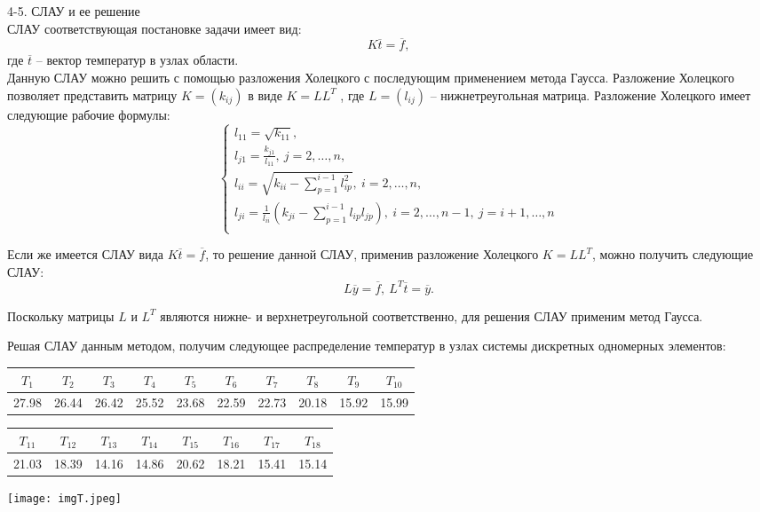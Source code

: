 \documentclass[a4paper, 12pt]{article}
\begin{document}
\newpage

4-5. СЛАУ и ее решение \\

СЛАУ соответствующая постановке задачи имеет вид:
\[K \overline t = \overline f,\]
где $\overline t$ – вектор температур в узлах области. \\

Данную СЛАУ можно решить с помощью разложения
Холецкого с последующим применением метода Гаусса. 
Разложение Холецкого позволяет представить матрицу $K = (k_{ij})$ в виде $K=LL^T$ , где $L = (l_{ij})$ – нижнетреугольная матрица. Разложение Холецкого имеет следующие рабочие формулы:
\[
\begin{cases}
l_{11} = \sqrt{k_{11}},\\
l_{j1} = \frac{k_{j1}}{l_{11}},\ j = 2, \dots, n,\\
l_{ii} = \sqrt{k_{ii} - \sum \limits_{p=1}^{i-1} l_{ip}^2}, \ i = 2, \dots, n,\\
l_{ji} = \frac{1}{l_{ii}} \left( k_{ji} - \sum \limits_{p=1}^{i-1} l_{ip} l_{jp} \right),\ i = 2, \dots, n-1,\ j = i+1, \dots, n\\
\end{cases}
\]

Если же имеется СЛАУ вида $K \overline t = \overline f$, то решение данной СЛАУ, применив разложение
Холецкого $K=LL^T$, можно получить следующие СЛАУ:
\[L \overline y = \overline f,\ L^T \overline t = \overline y.\]

Поскольку матрицы $L$ и $L^T$ являются нижне- и верхнетреугольной соответственно, для решения
СЛАУ применим метод Гаусса.

Решая СЛАУ данным методом, получим следующее распределение температур в узлах системы дискретных одномерных элементов:

\begin{table}[h]
    \centering
    \begin{tabular}{|c|c|c|c|c|c|c|c|c|c|}
        \toprule
        $T_1$&$T_2$&$T_3$&$T_4$&$T_5$&$T_6$&$T_7$&$T_8$&$T_9$&$T_{10}$\\ 
        \midrule
        27.98&26.44&26.42&25.52&23.68&22.59&22.73&20.18&15.92&15.99 \\ 
  \bottomrule
    \end{tabular}
\end{table}
\begin{table}[h]
    \centering
    \begin{tabular}{|c|c|c|c|c|c|c|c|}
        \toprule
        $T_{11}$&$T_{12}$&$T_{13}$&$T_{14}$&$T_{15}$&$T_{16}$&$T_{17}$&$T_{18}$\\ 
        \midrule
        21.03&18.39&14.16&14.86&20.62&18.21&15.41&15.14 \\ 
  \bottomrule
    \end{tabular}
\end{table}

\begin{center}
\texttt{[image: imgT.jpeg]}
\end{center}
\end{document}
